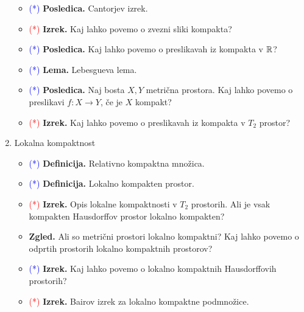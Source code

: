 \begin{enumerate}
\begin{itemize}
        \item \textcolor{blue}{(*)} \textbf{Posledica.} Cantorjev izrek.
        \item \textcolor{red}{(*)} \textbf{Izrek.} Kaj lahko povemo o zvezni sliki kompakta?
        \item \textcolor{blue}{(*)} \textbf{Posledica.} Kaj lahko povemo o preslikavah iz kompakta v \(\mathbb{R}\)?
        \item \textcolor{blue}{(*)} \textbf{Lema.} Lebesgueva lema.
        \item \textcolor{blue}{(*)} \textbf{Posledica.} Naj bosta \(X, Y\) metrična prostora. Kaj lahko povemo o preslikavi \(f: X \to Y\), če je \(X\) kompakt?
        \item \textcolor{red}{(*)} \textbf{Izrek.} Kaj lahko povemo o preslikavah iz kompakta v \(T_2\) prostor?
    \end{itemize}

    \item Lokalna kompaktnost
    \begin{itemize}
        \item \textcolor{blue}{(*)} \textbf{Definicija.} Relativno kompaktna množica.
        \item \textcolor{blue}{(*)} \textbf{Definicija.} Lokalno kompakten prostor.
        \item \textcolor{red}{(*)} \textbf{Izrek.} Opis lokalne kompaktnosti v \(T_2\) prostorih. Ali je vsak kompakten Hausdorffov prostor lokalno kompakten?
        \item \textbf{Zgled.} Ali so metrični prostori lokalno kompaktni? Kaj lahko povemo o odprtih prostorih lokalno kompaktnih prostorov?
        \item \textcolor{blue}{(*)} \textbf{Izrek.} Kaj lahko povemo o lokalno kompaktnih Hausdorffovih prostorih? 
        \item \textcolor{red}{(*)} \textbf{Izrek.} Bairov izrek za lokalno kompaktne podmnožice.
    \end{itemize}
\end{enumerate}